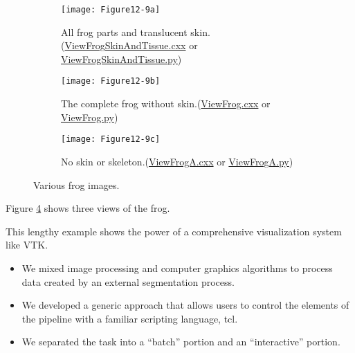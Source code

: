 \begin{figure}[htb]
	\begin{subfigure}[h]{0.48\linewidth}
		\texttt{[image: Figure12-9a]}
		\caption{All frog parts and translucent skin.(\href{https://lorensen.github.io/VTKExamples/site/Cxx/Visualization/ViewFrogSkinAndTissue}{ViewFrogSkinAndTissue.cxx} or \href{https://lorensen.github.io/VTKExamples/site/Python/Visualization/ViewFrogSkinAndTissue/}{ViewFrogSkinAndTissue.py})}\label{fig:Figure12-9a}
	\end{subfigure}
	\hfill
	\begin{subfigure}[h]{0.48\linewidth}
		\texttt{[image: Figure12-9b]}
		\caption{The complete frog without skin.(\href{https://lorensen.github.io/VTKExamples/site/Cxx/Visualization/ViewFrog}{ViewFrog.cxx} or \href{https://lorensen.github.io/VTKExamples/site/Python/Visualization/ViewFrog/}{ViewFrog.py})}\label{fig:Figure12-9b}
	\end{subfigure}%
	\hfill
	\begin{subfigure}[h]{0.48\linewidth}
		\texttt{[image: Figure12-9c]}
		\caption{No skin or skeleton.(\href{https://lorensen.github.io/VTKExamples/site/Cxx/Visualization/ViewFrogA}{ViewFrogA.cxx} or \href{https://lorensen.github.io/VTKExamples/site/Python/Visualization/ViewFrogA/}{ViewFrogA.py})}\label{fig:Figure12-9c}
	\end{subfigure}
	\caption{Various frog images.}\label{fig:Figure12-9}
\end{figure}

Figure \ref{fig:Figure12-9} shows three views of the frog.

This lengthy example shows the power of a comprehensive visualization system like VTK.

\begin{itemize}

    \item We mixed image processing and computer graphics algorithms to process data created by an external segmentation process.

    \item We developed a generic approach that allows users to control the elements of the pipeline with a familiar scripting language, tcl.

    \item We separated the task into a ``batch'' portion and an ``interactive'' portion.

\end{itemize}

